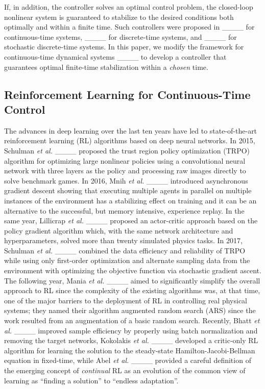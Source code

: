 If, in addition, the controller solves an optimal control problem, the closed-loop nonlinear system is guaranteed to stabilize to the desired conditions both optimally and within a finite time. Such controllers were proposed in ____ for continuous-time systems, ____ for discrete-time systems, and ____ for stochastic discrete-time systems. In this paper, we modify the framework for continuous-time dynamical systems ____ to develop a controller that guarantees optimal finite-time stabilization within a \emph{chosen} time.








\subsection{Reinforcement Learning for Continuous-Time Control}          
The advances in deep learning over the last ten years have led to state-of-the-art reinforcement learning (RL) algorithms based on deep neural networks. In 2015, Schulman \emph{et al.} ____ proposed the trust region policy optimization (TRPO)  algorithm for optimizing large nonlinear policies using a convolutional neural network with three layers as the policy and processing raw images directly to solve benchmark games. In 2016, Mnih \emph{et al.} ____ introduced asynchronous gradient descent showing that executing multiple agents in parallel on multiple instances of the environment has a stabilizing effect on training and it can be an alternative to the successful, but memory intensive, experience replay. In the same year, Lillicrap \emph{et al.} ____ proposed an actor-critic approach based on the policy gradient algorithm which, with the same network architecture and hyperparameters, solved more than twenty simulated physics tasks. In 2017, Schulman \emph{et al.} ____ combined the data efficiency and reliability of TRPO while using only first-order optimization and alternate sampling data from the environment with optimizing the objective function via stochastic gradient ascent. The following year, Mania \emph{et al.} ____ aimed to significantly simplify the overall approach to RL since the complexity of the existing algorithms was, at that time, one of the major barriers to the deployment of RL in controlling real physical systems; they named their algorithm augmented random search (ARS) since the work resulted from an augmentation of a basic random search. Recently, Bhatt \emph{et al.} ____ improved sample efficiency by properly using batch normalization and removing the target networks, Kokolakis \emph{et al.} ____ developed a critic-only RL algorithm for learning the solution to the steady-state Hamilton-Jacobi-Bellman equation in fixed-time, while Abel \emph{et al.} ____ provided a careful definition of the emerging concept of \emph{continual} RL as an evolution of the common view of learning as ``finding a solution'' to ``endless adaptation''.